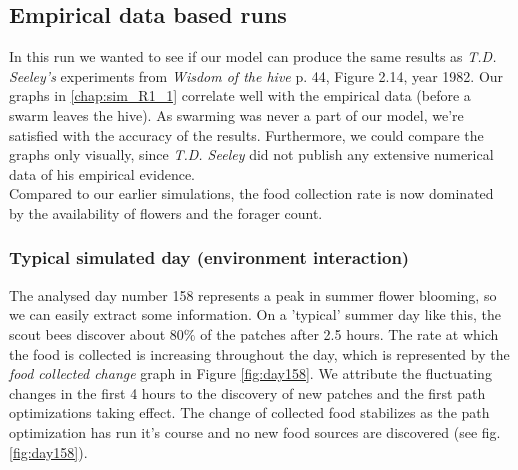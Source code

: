 \subsection{Empirical data based runs}
	In this run we wanted to see if our model can produce the same results as \textit{T.D. Seeley's} experiments from \textit{Wisdom of the hive} p. 44, Figure  2.14, year 1982. Our graphs in \ref{chap:sim_R1_1} correlate well with the empirical data (before a swarm leaves the hive). As swarming was never a part of our model, we're satisfied with the accuracy of the results. Furthermore, we could compare the graphs only visually, since \textit{T.D. Seeley} did not publish any  extensive numerical data of his empirical evidence.\\
	Compared to our earlier simulations, the food collection rate is now dominated by the availability of flowers and the forager count.
	
	\subsubsection{Typical simulated day (environment interaction)}
		The analysed day number 158 represents a peak in summer flower blooming, so we can easily extract some information. On a 'typical' summer day like this, the scout bees discover about $80\%$ of the patches after 2.5 hours. The rate at which the food is collected is increasing throughout the day, which is represented by the \textit{food collected change} graph in Figure \ref{fig:day158}. We attribute the fluctuating changes in the first 4 hours to the discovery of new patches and the first path optimizations taking effect. The change of collected food stabilizes as the path optimization has run it's course and no new food sources are discovered (see fig. \ref{fig:day158}).\\
		
